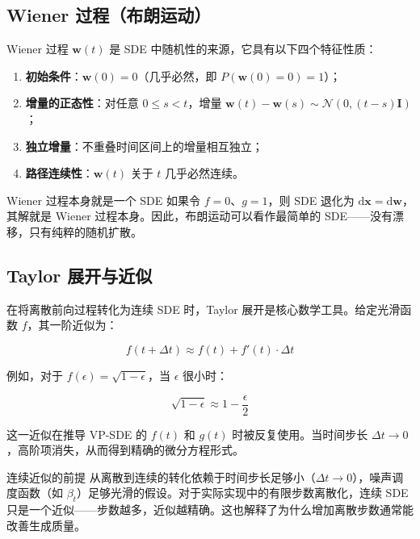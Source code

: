 \documentclass[a4paper]{article}
\begin{document}
\subsection{Wiener 过程（布朗运动）}

Wiener 过程 $\mathbf{w}(t)$ 是 SDE 中随机性的来源，它具有以下四个特征性质：

\begin{enumerate}
    \item \textbf{初始条件}：$\mathbf{w}(0) = 0$（几乎必然，即 $P(\mathbf{w}(0)=0) = 1$）；
    \item \textbf{增量的正态性}：对任意 $0 \le s < t$，增量 $\mathbf{w}(t) - \mathbf{w}(s) \sim \mathcal{N}(0, (t-s)\mathbf{I})$；
    \item \textbf{独立增量}：不重叠时间区间上的增量相互独立；
    \item \textbf{路径连续性}：$\mathbf{w}(t)$ 关于 $t$ 几乎必然连续。
\end{enumerate}

\begin{knowledgebox}{Wiener 过程本身就是一个 SDE}
如果令 $f = 0$、$g = 1$，则 SDE 退化为 $\mathrm{d}\mathbf{x} = \mathrm{d}\mathbf{w}$，其解就是 Wiener 过程本身。因此，布朗运动可以看作最简单的 SDE——没有漂移，只有纯粹的随机扩散。
\end{knowledgebox}

\subsection{Taylor 展开与近似}

在将离散前向过程转化为连续 SDE 时，Taylor 展开是核心数学工具。给定光滑函数 $f$，其一阶近似为：

$$
f(t + \Delta t) \approx f(t) + f'(t) \cdot \Delta t
$$

例如，对于 $f(\epsilon) = \sqrt{1 - \epsilon}$，当 $\epsilon$ 很小时：

$$
\sqrt{1 - \epsilon} \approx 1 - \frac{\epsilon}{2}
$$

这一近似在推导 VP-SDE 的 $f(t)$ 和 $g(t)$ 时被反复使用。当时间步长 $\Delta t \to 0$，高阶项消失，从而得到精确的微分方程形式。

\begin{warningbox}{连续近似的前提}
从离散到连续的转化依赖于时间步长足够小（$\Delta t \to 0$），噪声调度函数（如 $\beta_t$）足够光滑的假设。对于实际实现中的有限步数离散化，连续 SDE 只是一个近似——步数越多，近似越精确。这也解释了为什么增加离散步数通常能改善生成质量。
\end{warningbox}
\end{document}

